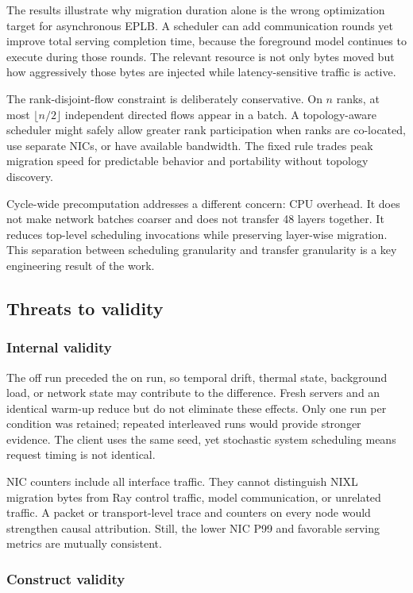 The results illustrate why migration duration alone is the wrong optimization
target for asynchronous EPLB. A scheduler can add communication rounds yet
improve total serving completion time, because the foreground model continues
to execute during those rounds. The relevant resource is not only bytes moved
but how aggressively those bytes are injected while latency-sensitive traffic
is active.

The rank-disjoint-flow constraint is deliberately conservative. On $n$ ranks,
at most $\lfloor n/2\rfloor$ independent directed flows appear in a batch. A
topology-aware scheduler might safely allow greater rank participation when
ranks are co-located, use separate NICs, or have available bandwidth. The
fixed rule trades peak migration speed for predictable behavior and
portability without topology discovery.

Cycle-wide precomputation addresses a different concern: CPU overhead. It does
not make network batches coarser and does not transfer 48 layers together. It
reduces top-level scheduling invocations while preserving layer-wise migration.
This separation between scheduling granularity and transfer granularity is a
key engineering result of the work.

\subsection{Threats to validity}

\subsubsection{Internal validity}

The off run preceded the on run, so temporal drift, thermal state, background
load, or network state may contribute to the difference. Fresh servers and an
identical warm-up reduce but do not eliminate these effects. Only one run per
condition was retained; repeated interleaved runs would provide stronger
evidence. The client uses the same seed, yet stochastic system scheduling means
request timing is not identical.

NIC counters include all interface traffic. They cannot distinguish NIXL
migration bytes from Ray control traffic, model communication, or unrelated
traffic. A packet or transport-level trace and counters on every node would
strengthen causal attribution. Still, the lower NIC P99 and favorable serving
metrics are mutually consistent.

\subsubsection{Construct validity}

